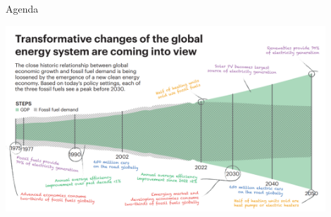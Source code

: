 \documentclass[aspectratio=169,hyperref={pdfpagelabels=false}]{beamer}
\subtitle{\normalsize{Industrial IoT for Digitization of Electronis Assets}}
\title{}
\begin{document}
\inserttitlepage

\begin{frame}{Agenda}
  \tableofcontents
\end{frame}

\begin{frame}{}

  \includegraphics[width=0.9\textwidth]{img/pic0.png} 
    \end{frame}
\end{document}
